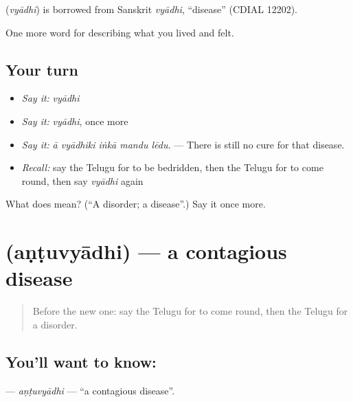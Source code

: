 \begin{cousinweb}
\textbf{} (\emph{vyādhi}) is borrowed from Sanskrit \emph{vyādhi}, \textquotedblleft{}disease\textquotedblright{} (CDIAL 12202).
\end{cousinweb}

\begin{grammarlens}[title={What you've built}]
One more word for describing what you lived and felt.
\end{grammarlens}

\subsection*{Your turn}
\begin{itemize}
\raggedright
  \item \emph{Say it:} \emph{vyādhi}
  \item \emph{Say it:} \emph{vyādhi}, once more
  \item \emph{Say it:} \emph{ā vyādhiki iṅkā mandu lēdu.} — There is still no cure for that disease.
  \item \emph{Recall:} say the Telugu for to be bedridden, then the Telugu for to come round, then say \emph{vyādhi} again
\end{itemize}

\begin{tcolorbox}[breakable,colback=teal!4,colframe=teal!35!black,title={Before you move on}]
What does  mean? (\textquotedblleft{}A disorder; a disease\textquotedblright{}.) Say it once more.
\end{tcolorbox}
\section[\texorpdfstring{\te{అంటువ్యాధి} (aṇṭuvyādhi)}{అంటువ్యాధి (aṇṭuvyādhi)}]{ (aṇṭuvyādhi) — a contagious disease}

\label{lesson:TE-C513-antuvyadhi}



\begin{quote}
Before the new one: say the Telugu for to come round, then the Telugu for a disorder.
\end{quote}

\subsection*{You'll want to know: }
\textbf{} — \emph{aṇṭuvyādhi} — \textquotedblleft{}a contagious disease\textquotedblright{}.

